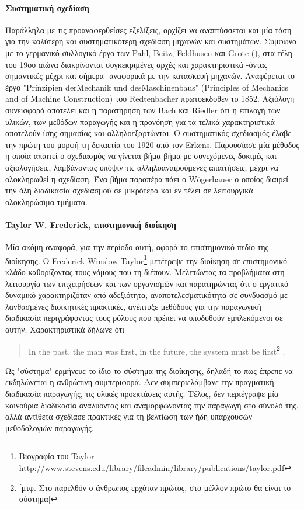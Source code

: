\documentclass[a4paper,12pt,twoside]{report}
\begin{document}
{			\paragraph{Συστηματική σχεδίαση}{Παράλληλα με τις προαναφερθείσες εξελίξεις, αρχίζει να αναπτύσσεται και μία τάση για την καλύτερη και συστηματικότερη σχεδίαση μηχανών και συστημάτων. Σύμφωνα με το γερμανικό συλλογικό έργο των Pahl, Beitz, Feldhusen και Grote (\cite[κεφ. 1.2.2 Historical Background]{EngineeringDesignASystematicApproach:Pahl1996}), στα τέλη του 19ου αιώνα διακρίνονται συγκεκριμένες αρχές και χαρακτηριστικά -όντας σημαντικές μέχρι και σήμερα- αναφορικά με την κατασκευή μηχανών. Αναφέρεται το έργο "Prinzipien derMechanik und desMaschinenbaus" (Principles of Mechanics and of Machine Construction) του Redtenbacher πρωτοεκδοθέν το 1852. Αξιόλογη συνεισφορά αποτελεί και η παρατήρηση των Bach και Riedler ότι η επιλογή των υλικών, των μεθόδων παραγωγής και η προνόηση για τα τελικά χαρακτηριστικά αποτελούν ίσης σημασίας και αλληλοεξαρτώνται. Ο συστηματικός σχεδιασμός έλαβε την πρώτη του μορφή τη δεκαετία του 1920 από τον Erkens. Παρουσίασε μία μέθοδος η οποία απαιτεί ο σχεδιασμός να γίνεται βήμα βήμα με συνεχόμενες δοκιμές και αξιολογήσεις, λαμβάνοντας υπόψιν τις αλληλοαναιρούμενες απαιτήσεις, μέχρι να ολοκληρωθεί η σχεδίαση. Ένα βήμα παραπέρα πάει ο W\"ogerbauer ο οποίος διαιρεί την όλη διαδικασία σχεδιασμού σε μικρότερα και εν τέλει σε λειτουργικά ολοκληρώσιμα τμήματα.
			}
			
			\paragraph{Taylor W. Frederick, επιστημονική διοίκηση}{Μία ακόμη αναφορά, για την περίοδο αυτή, αφορά το επιστημονικό πεδίο της διοίκησης. Ο Frederick Winslow Taylor\footnote{Βιογραφία του Taylor \url{http://www.stevens.edu/library/fileadmin/library/publications/taylor.pdf}} μετέτρεψε την διοίκηση σε επιστημονικό κλάδο καθορίζοντας τους νόμους που τη διέπουν. Μελετώντας τα προβλήματα στη λειτουργία των επιχειρήσεων και των οργανισμών και παρατηρώντας ότι ο εργατικό δυναμικό χαρακτηριζόταν από αδεξιότητα, αναποτελεσματικότητα σε συνδυασμό με λανθασμένες διοικητικές πρακτικές, ανέπτυξε μεθόδους για την παραγωγική διαδικασία περιγράφοντας τους ρόλους που πρέπει να υποδυθούν εμπλεκόμενοι σε αυτήν. Χαρακτηριστικά δήλωνε ότι \begin{quote}In the past, the man was first, in the future, the system must be first\footnote{[μτφ. Στο παρελθόν ο άνθρωπος ερχόταν πρώτος, στο μέλλον πρώτο θα είναι το σύστημα]} \cite[κεφ. Εισαγωγή]{PrinciplesOfScientificManagement:Taylor2004}.\end{quote} Ως "σύστημα" ερμήνευε το ίδιο το σύστημα της διοίκησης, δηλαδή το πως έπρεπε να εκδηλώνεται η ανθρώπινη συμπεριφορά. Δεν συμπεριελάμβανε την πραγματική διαδικασία παραγωγής, τις υλικές προεκτάσεις αυτής. Τέλος, δεν περιέγραψε μία καινούρια διαδικασία αναλύοντας και αναμορφώνοντας την παραγωγή στο σύνολό της, αλλά αντίθετα σχεδίασε πρακτικές για τη βελτίωση των ήδη υπαρχουσών μεθοδολογιών παραγωγής.
			}
}
\end{document}
